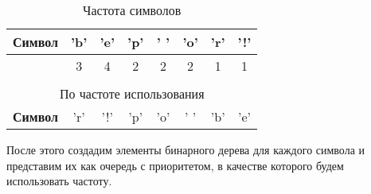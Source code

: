 \begin{table} [!htbp]%
  \centering
  \parbox{8cm}%
  {%
    \caption{Частота символов}%
    \label{tabl:tab8x1}%
    \begin{SingleSpace}
    \begin{tabular}{lccccccc}
    \hline
    \multicolumn{1}{|l|}{\textbf{Символ}}                          & \multicolumn{1}{c|}{'b'}                       & \multicolumn{1}{c|}{'e'}                       & \multicolumn{1}{c|}{'p'}                       & \multicolumn{1}{c|}{' '}                       & \multicolumn{1}{c|}{'o'}                       & \multicolumn{1}{c|}{'r'}                       & \multicolumn{1}{c|}{'!'}                       \\ \hline
    \rowcolor[HTML]{EFEFEF}
    \multicolumn{1}{|l|}{\cellcolor[HTML]{EFEFEF}\textbf{Частота}} & \multicolumn{1}{c|}{\cellcolor[HTML]{EFEFEF}3} & \multicolumn{1}{c|}{\cellcolor[HTML]{EFEFEF}4} & \multicolumn{1}{c|}{\cellcolor[HTML]{EFEFEF}2} & \multicolumn{1}{c|}{\cellcolor[HTML]{EFEFEF}2} & \multicolumn{1}{c|}{\cellcolor[HTML]{EFEFEF}2} & \multicolumn{1}{c|}{\cellcolor[HTML]{EFEFEF}1} & \multicolumn{1}{c|}{\cellcolor[HTML]{EFEFEF}1} \\ \hline
    \\
    \multicolumn{8}{c}{По частоте использования}                                                                                                                                                                                                                                                                                                                                                                             \\ \hline
    \multicolumn{1}{|l|}{\textbf{Символ}}                          & \multicolumn{1}{c|}{'r'}                       & \multicolumn{1}{c|}{'!'}                       & \multicolumn{1}{c|}{'p'}                       & \multicolumn{1}{c|}{'o'}                       & \multicolumn{1}{c|}{' '}                       & \multicolumn{1}{c|}{'b'}                       & \multicolumn{1}{c|}{'e'}                       \\ \hline
    \end{tabular}
    \end{SingleSpace}
    }
\end{table}

После этого создадим элементы бинарного дерева для каждого символа и
представим их как очередь с приоритетом, в качестве которого будем
использовать частоту.

